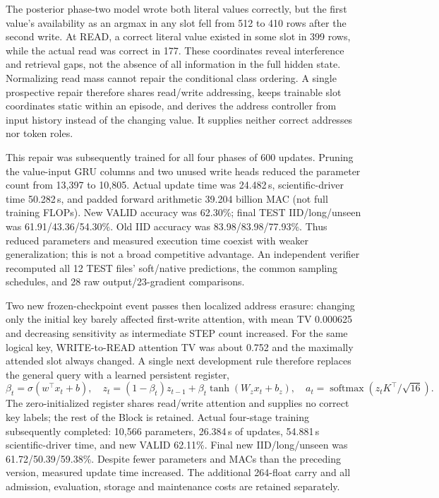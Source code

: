 The posterior phase-two model wrote both literal values correctly, but the
first value's availability as an argmax in any slot fell from 512 to 410
rows after the second write. At READ, a correct literal value existed in
some slot in 399 rows, while the actual read was correct in 177. These
coordinates reveal interference and retrieval gaps, not the absence of all
information in the full hidden state. Normalizing read mass cannot repair
the conditional class ordering. A single prospective repair therefore
shares read/write addressing, keeps trainable slot coordinates static within
an episode, and derives the address controller from input history instead
of the changing value. It supplies neither correct addresses nor token
roles.

This repair was subsequently trained for all four phases of 600 updates.
Pruning the value-input GRU columns and two unused write heads reduced the
parameter count from 13,397 to 10,805. Actual update time was 24.482\,s,
scientific-driver time 50.282\,s, and padded forward arithmetic 39.204 billion
MAC (not full training FLOPs). New VALID accuracy was 62.30\%; final TEST
IID/long/unseen was 61.91/43.36/54.30\%. Old IID accuracy was
83.98/83.98/77.93\%. Thus reduced parameters and measured execution time
coexist with weaker generalization; this is not a broad competitive advantage.
An independent verifier recomputed all 12 TEST files' soft/native predictions,
the common sampling schedules, and 28 raw output/23-gradient comparisons.

Two new frozen-checkpoint event passes then localized address erasure:
changing only the initial key barely affected first-write attention, with mean
TV 0.000625 and decreasing sensitivity as intermediate STEP count increased.
For the same logical key, WRITE-to-READ attention TV was about 0.752 and
the maximally attended slot always changed. A single next development rule
therefore replaces the general query with a learned persistent register,
\begin{equation}
\beta_t=\sigma(w^\top x_t+b),\quad
z_t=(1-\beta_t)z_{t-1}+\beta_t\tanh(W_zx_t+b_z),\quad
a_t=\operatorname{softmax}(z_tK^\top/\sqrt{16}).
\end{equation}
The zero-initialized register shares read/write attention and supplies no
correct key labels; the rest of the Block is retained. Actual four-stage
training subsequently completed: 10,566 parameters, 26.384\,s of updates,
54.881\,s scientific-driver time, and new VALID 62.11\%. Final new
IID/long/unseen was 61.72/50.39/59.38\%. Despite fewer parameters and MACs
than the preceding version, measured update time increased. The additional
264-float carry and all admission, evaluation, storage and maintenance costs
are retained separately.

